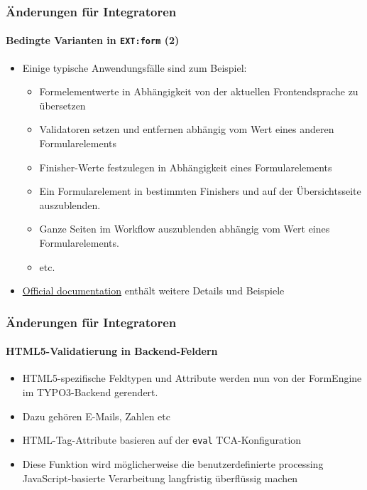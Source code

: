\begin{frame}[fragile]
	\frametitle{Änderungen für Integratoren}
	\framesubtitle{Bedingte Varianten in \texttt{EXT:form} (2)}

	\begin{itemize}
		\item Einige typische Anwendungsfälle sind zum Beispiel:

			\begin{itemize}
				\item Formelementwerte in Abhängigkeit von der aktuellen Frontendsprache
					zu übersetzen
				\item Validatoren setzen und entfernen abhängig vom Wert eines anderen
					Formularelements
				\item Finisher-Werte festzulegen in Abhängigkeit eines Formularelements
				\item Ein Formularelement in bestimmten Finishers und auf der Übersichtsseite auszublenden. 
				\item Ganze Seiten im Workflow auszublenden abhängig vom Wert eines
					Formularelements.
				\item etc.
			\end{itemize}

		\item \href{https://docs.typo3.org/typo3cms/extensions/form}{Official documentation}
			enthält weitere Details und Beispiele

	\end{itemize}

\end{frame}


\begin{frame}[fragile]
	\frametitle{Änderungen für Integratoren}
	\framesubtitle{HTML5-Validatierung in Backend-Feldern}

	\begin{itemize}
		\item HTML5-spezifische Feldtypen und Attribute werden nun von der FormEngine
			im TYPO3-Backend gerendert.
		\item Dazu gehören E-Mails, Zahlen etc
		\item HTML-Tag-Attribute basieren auf der \texttt{eval} TCA-Konfiguration
		\item Diese Funktion wird möglicherweise die benutzerdefinierte processing JavaScript-basierte 
			Verarbeitung langfristig überflüssig machen
	\end{itemize}

\end{frame}

